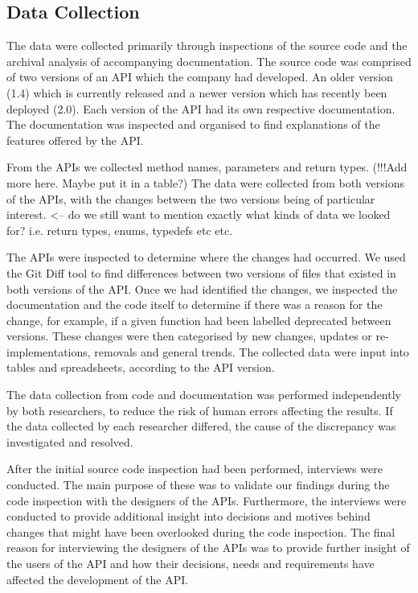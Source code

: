 \documentclass{sig-alternate}
\begin{document}
\subsection{Data Collection} \label{data_collection}
The data were collected primarily through inspections of the source code and the archival analysis of accompanying  documentation. The source code was comprised of two versions of an API which the company had developed. An older version (1.4) which is currently released and a newer version which has recently been deployed (2.0). Each version of the API had its own respective documentation. The documentation was inspected and organised to find explanations of the features offered by the API. 

From the APIs we collected method names, parameters and return types. (!!!Add more here. Maybe put it in a table?) The data were collected from both versions of the APIs, with the changes between the two versions being of particular interest. <-- do we still want to mention exactly what kinds of data we looked for? i.e. return types, enums, typedefs etc etc.

The APIs were inspected to determine where the changes had occurred. We used the Git Diff tool to find differences between two versions of files that existed in both versions of the API. Once we had identified the changes, we inspected the documentation and the code itself to determine if there was a reason for the change, for example, if a given function had been labelled deprecated between versions. These changes were then categorised by new changes, updates or re-implementations, removals and general trends. The collected data were input into tables and spreadsheets, according to the API version.

The data collection from code and documentation was performed independently by both researchers, to reduce the risk of human errors affecting the results. If the data collected by each researcher differed, the cause of the discrepancy was investigated and resolved. 

After the initial source code inspection had been performed, interviews were conducted. The main purpose of these was to validate our findings during the code inspection with the designers of the APIs. Furthermore, the interviews were conducted to provide additional insight into decisions and motives behind changes that might have been overlooked during the code inspection. The final reason for interviewing the designers of the APIs was to provide further insight of the users of the API and how their decisions, needs and requirements have affected the development of the API.
\end{document}
